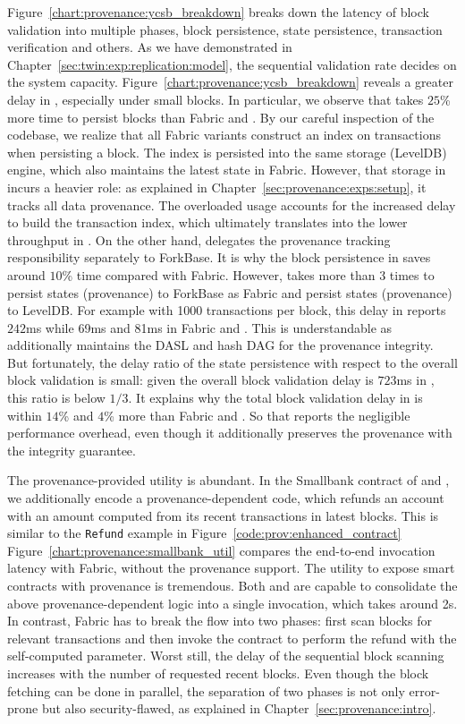 Figure~\ref{chart:provenance:ycsb_breakdown} breaks down the latency of block validation into multiple phases, block persistence, state persistence, transaction verification and others. 
As we have demonstrated in Chapter~\ref{sec:twin:exp:replication:model}, the sequential validation rate decides on the system capacity. 
Figure~\ref{chart:provenance:ycsb_breakdown} reveals a greater delay in {\fsPrO}, especially under small blocks. 
In particular, we observe that {\fsPrO} takes $25$\% more time to persist blocks than Fabric and {\fsO}.
By our careful inspection of the codebase, we realize that all Fabric variants construct an index on transactions when persisting a block. 
The index is persisted into the same storage (LevelDB) engine, which also maintains the latest state in Fabric.
However, that storage in {\fsPrO} incurs a heavier role: as explained in Chapter~\ref{sec:provenance:exps:setup}, it tracks all data provenance. 
The overloaded usage accounts for the increased delay to build the transaction index, which ultimately translates into the lower throughput in {\fsPrO}. 
On the other hand,  {\fsO} delegates the provenance tracking responsibility separately to ForkBase. 
It is why the block persistence in {\fsO} saves around $10$\% time compared with Fabric. 
However, {\fsO} takes more than 3 times to persist states (provenance) to ForkBase as Fabric and {\fsPrO} persist states (provenance) to LevelDB. 
For example with 1000 transactions per block, this delay in {\fsO} reports $242$ms while 69ms and 81ms in Fabric and {\fsPrO}.
This is understandable as {\fsO} additionally maintains the DASL and hash DAG for the provenance integrity. 
But fortunately, the delay ratio of the state persistence with respect to the overall block validation is small:
given the overall block validation delay is $723$ms in {\fsO}, this ratio is below $1/3$.
It explains why the total block validation delay in {\fsO} is within $14$\% and $4$\% more than Fabric and {\fsO}. 
So that {\fsO} reports the negligible performance overhead, even though it additionally preserves the provenance with the integrity guarantee.

The provenance-provided utility is abundant. In the Smallbank contract of {\fsPrO} and {\fsO}, we additionally encode a provenance-dependent code, which refunds an account with an amount computed from its recent transactions in latest blocks.
This is similar to the \texttt{Refund} example in Figure~\ref{code:prov:enhanced_contract}
Figure~\ref{chart:provenance:smallbank_util} compares the end-to-end invocation latency with Fabric, without the provenance support. 
The utility to expose smart contracts with provenance is tremendous. 
Both {\fsO} and {\fsPrO} are capable to consolidate the above provenance-dependent logic into a single invocation, which takes around 2s. 
In contrast, Fabric has to break the flow into two phases: first scan blocks for relevant transactions and then invoke the contract to perform the refund with the self-computed parameter. 
Worst still, the delay of the sequential block scanning increases with the number of requested recent blocks. 
Even though the block fetching can be done in parallel, 
the separation of two phases is not only error-prone but also security-flawed, as explained in Chapter~\ref{sec:provenance:intro}.

